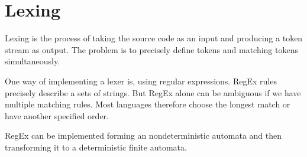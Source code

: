 \section*{Lexing}

Lexing is the process of taking the source code as an input and producing a token stream as output. The problem is to precisely define tokens and matching tokens simultaneously.\medskip

One way of implementing a lexer is, using regular expressions. RegEx rules precisely describe a sets of strings. But RegEx alone can be ambiguous if we have multiple matching rules. Most languages therefore choose the longest match or have another specified order. \medskip

RegEx can be implemented forming an nondeterministic automata and then transforming it to a deterministic finite automata.
